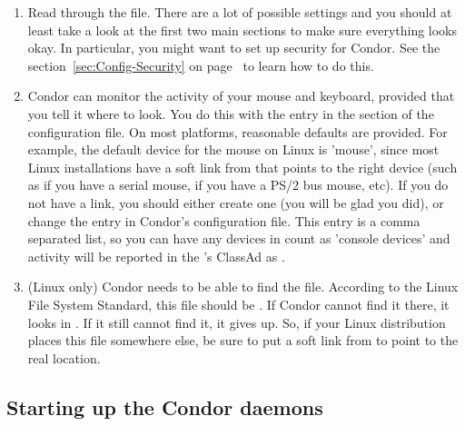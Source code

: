 \begin{enumerate}
\item Read through the  file.  There are a
    lot of possible settings and you should at least take a look at
    the first two main sections to make sure everything looks okay.
    In particular, you might want to set up security for
    Condor.  See the section~\ref{sec:Config-Security} on
    page~\pageref{sec:Config-Security} to learn how to do this.

\item Condor can monitor the activity of your mouse and keyboard,
    provided that you tell it where to look.  You do this with the
     entry in the  section of
    the configuration file.  On most platforms, reasonable
    defaults are provided.
    For example, the default device for the mouse on Linux
    is 'mouse', since most Linux installations have a soft link from
     that points to the right device (such as
     if you have a serial mouse,  if you have
    a PS/2 bus mouse, etc).  If you do not have a 
    link, you should either create one (you will be glad you did), or
    change the  entry in Condor's
    configuration file.
    This entry is a comma separated list, so you can have any
    devices in  count as 'console devices' and activity
    will be reported in the 's ClassAd as
    .

\item  (Linux only) Condor needs to be able to find the  file.
    According to the Linux File System Standard, this file should be
    .  If Condor cannot find it there, it looks in
    .  If it still cannot find it, it gives up.  So, if
    your Linux distribution places this file somewhere else, be sure to
    put a soft link from  to point to the real location.

\end{enumerate}

\subsection{\label{sec:Run-Condor} Starting up the Condor daemons}

